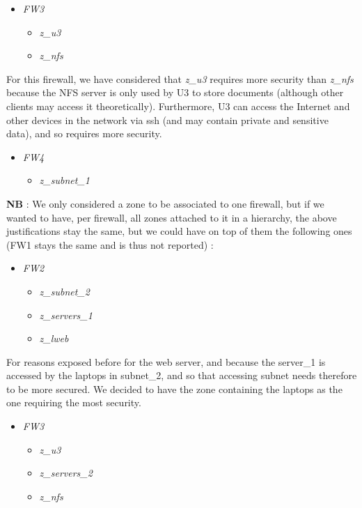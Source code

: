 \documentclass[a4paper, 12pt]{article}
\begin{document}
    \begin{itemize}
	    \item \emph{FW3}
	    \begin{itemize}
	        \item \emph{z\_u3}
	        \item \emph{z\_nfs}
	    \end{itemize}
    \end{itemize}
    
    For this firewall, we have considered that \emph{z\_u3} requires more security than \emph{z\_nfs} because the NFS server is only used by U3 to store documents (although other clients may access it theoretically). Furthermore, U3 can access the Internet and other devices in the network via ssh (and may contain private and sensitive data), and so requires more security. 
    
    \begin{itemize}
	    \item \emph{FW4}
	    \begin{itemize}
	        \item \emph{z\_subnet\_1}
	    \end{itemize}
	\end{itemize}
	
	\textbf{NB} : We only considered a zone to be associated to one firewall, but if we wanted to have, per firewall, all zones attached to it in a hierarchy, the above justifications stay the same, but we could have on top of them the following ones (FW1 stays the same and is thus not reported) : 
    
    \begin{itemize}
	    \item \emph{FW2}
	    \begin{itemize}
	        \item \emph{z\_subnet\_2}
	        \item \emph{z\_servers\_1}
	        \item \emph{z\_lweb}
	    \end{itemize}
    \end{itemize}
    
    For reasons exposed before for the web server, and because the server\_1 is accessed by the laptops in subnet\_2, and so that accessing subnet needs therefore to be more secured. We decided to have the zone containing the laptops as the one requiring the most security.
    
    \begin{itemize}
	    \item \emph{FW3}
	    \begin{itemize}
	        \item \emph{z\_u3}
	        \item \emph{z\_servers\_2}
	        \item \emph{z\_nfs}
	    \end{itemize}
    \end{itemize}
    
\end{document}
